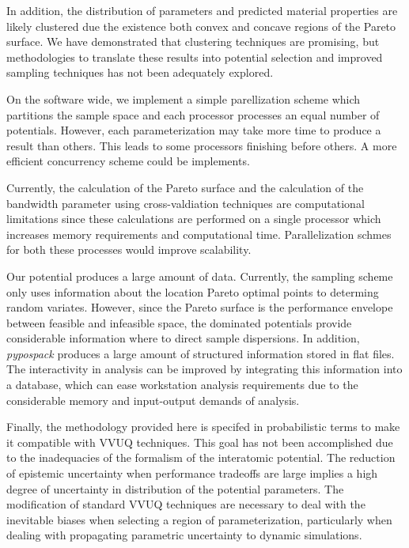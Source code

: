 In addition, the distribution of parameters and predicted material properties are likely clustered due the existence both convex and concave regions of the Pareto surface.  We have demonstrated that clustering techniques are promising, but methodologies to translate these results into potential selection and improved sampling techniques has not been adequately explored.

On the software wide, we implement a simple parellization scheme which partitions the sample space and each processor processes an equal number of potentials.  However, each parameterization may take more time to produce a result than others.  This leads to some processors finishing before others.  A more efficient concurrency scheme could be implements.

Currently, the calculation of the Pareto surface and the calculation of the bandwidth parameter using cross-valdiation techniques are computational limitations since these calculations are performed on a single processor which increases memory requirements and computational time.   Parallelization schmes for both these processes would improve scalability.

Our potential produces a large amount of data.  Currently, the sampling scheme only uses information about the location Pareto optimal points to determing random variates.  However, since the Pareto surface is the performance envelope between feasible and infeasible space, the dominated potentials provide considerable information where to direct sample dispersions.  In addition, \emph{pypospack} produces a large amount of structured information stored in flat files.  The interactivity in analysis can be improved by integrating this information into a database, which can ease workstation analysis requirements due to the considerable memory and input-output demands of analysis.

Finally, the methodology provided here is specifed in probabilistic terms to make it compatible with VVUQ techniques.  This goal has not been accomplished due to the inadequacies of the formalism of the interatomic potential.  The reduction of epistemic uncertainty when performance tradeoffs are large implies a high degree of uncertainty in distribution of the potential parameters.  The modification of standard VVUQ techniques are necessary to deal with the inevitable biases when selecting a region of parameterization, particularly when dealing with propagating parametric uncertainty to dynamic simulations.
